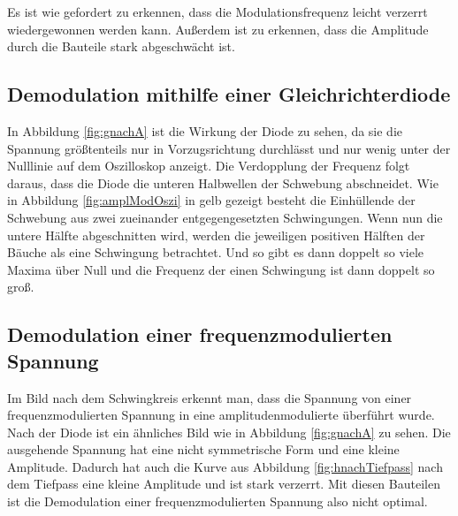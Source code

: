 Es ist wie gefordert zu erkennen, dass die Modulationsfrequenz leicht verzerrt wiedergewonnen werden kann. Außerdem ist zu erkennen, dass die Amplitude durch die Bauteile stark abgeschwächt ist.

\subsection{Demodulation mithilfe einer Gleichrichterdiode}
In Abbildung \ref{fig:gnachA} ist die Wirkung der Diode zu sehen, da sie die Spannung größtenteils nur in Vorzugsrichtung durchlässt und nur wenig unter der Nulllinie auf dem Oszilloskop anzeigt.
Die Verdopplung der Frequenz folgt daraus, dass die Diode die unteren Halbwellen der Schwebung abschneidet. Wie in Abbildung \ref{fig:amplModOszi} in gelb gezeigt besteht die Einhüllende der Schwebung aus zwei zueinander entgegengesetzten Schwingungen. Wenn nun die untere Hälfte abgeschnitten wird, werden die jeweiligen positiven Hälften der Bäuche als eine Schwingung betrachtet. Und so gibt es dann doppelt so viele Maxima über Null und die Frequenz der einen Schwingung ist dann doppelt so groß.


\subsection{Demodulation einer frequenzmodulierten Spannung}
Im Bild nach dem Schwingkreis erkennt man, dass die Spannung von einer frequenzmodulierten Spannung in eine amplitudenmodulierte überführt wurde.
Nach der Diode ist ein ähnliches Bild wie in Abbildung \ref{fig:gnachA} zu sehen. Die ausgehende Spannung hat eine nicht symmetrische Form und eine kleine Amplitude. Dadurch hat auch die Kurve aus Abbildung \ref{fig:hnachTiefpass} nach dem Tiefpass eine kleine Amplitude und ist stark verzerrt. Mit diesen Bauteilen ist die Demodulation einer frequenzmodulierten Spannung also nicht optimal.
